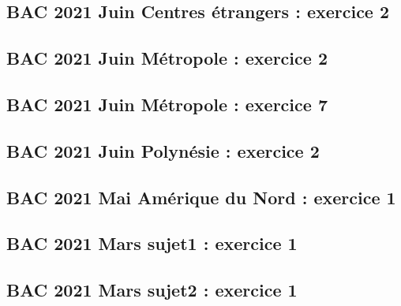\documentclass[lang=fr,edition=teacher,layout=sheet]{mxbook}
\begin{document}
\begingroup\endgroup
\par\bigskip
{}\subsection*{BAC 2021 Juin Centres étrangers : exercice 2}
\begingroup\endgroup
\par\bigskip
{}\subsection*{BAC 2021 Juin Métropole : exercice 2}
\begingroup\endgroup
\par\bigskip
{}\subsection*{BAC 2021 Juin Métropole : exercice 7}
\begingroup\endgroup
\par\bigskip
{}\subsection*{BAC 2021 Juin Polynésie : exercice 2}
\begingroup\endgroup
\par\bigskip
{}\subsection*{BAC 2021 Mai Amérique du Nord : exercice 1}
\begingroup\endgroup
\par\bigskip
{}\subsection*{BAC 2021 Mars sujet1 : exercice 1}
\begingroup\endgroup
\par\bigskip
{}\subsection*{BAC 2021 Mars sujet2 : exercice 1}
\end{document}
